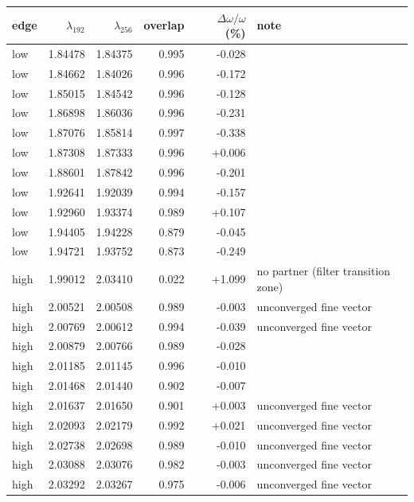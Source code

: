 \begin{tabular}{@{}lrrrrl@{}}
\hline\hline
 edge & $\lambda_{192}$ & $\lambda_{256}$ & overlap & $\Delta\omega/\omega$ (\%) & note \\
\hline
 low & 1.84478 & 1.84375 & 0.995 & -0.028 &  \\
 low & 1.84662 & 1.84026 & 0.996 & -0.172 &  \\
 low & 1.85015 & 1.84542 & 0.996 & -0.128 &  \\
 low & 1.86898 & 1.86036 & 0.996 & -0.231 &  \\
 low & 1.87076 & 1.85814 & 0.997 & -0.338 &  \\
 low & 1.87308 & 1.87333 & 0.996 & +0.006 &  \\
 low & 1.88601 & 1.87842 & 0.996 & -0.201 &  \\
 low & 1.92641 & 1.92039 & 0.994 & -0.157 &  \\
 low & 1.92960 & 1.93374 & 0.989 & +0.107 &  \\
 low & 1.94405 & 1.94228 & 0.879 & -0.045 &  \\
 low & 1.94721 & 1.93752 & 0.873 & -0.249 &  \\
 high & 1.99012 & 2.03410 & 0.022 & +1.099 & no partner (filter transition zone) \\
 high & 2.00521 & 2.00508 & 0.989 & -0.003 & unconverged fine vector \\
 high & 2.00769 & 2.00612 & 0.994 & -0.039 & unconverged fine vector \\
 high & 2.00879 & 2.00766 & 0.989 & -0.028 &  \\
 high & 2.01185 & 2.01145 & 0.996 & -0.010 &  \\
 high & 2.01468 & 2.01440 & 0.902 & -0.007 &  \\
 high & 2.01637 & 2.01650 & 0.901 & +0.003 & unconverged fine vector \\
 high & 2.02093 & 2.02179 & 0.992 & +0.021 & unconverged fine vector \\
 high & 2.02738 & 2.02698 & 0.989 & -0.010 & unconverged fine vector \\
 high & 2.03088 & 2.03076 & 0.982 & -0.003 & unconverged fine vector \\
 high & 2.03292 & 2.03267 & 0.975 & -0.006 & unconverged fine vector \\
\hline\hline
\end{tabular}
